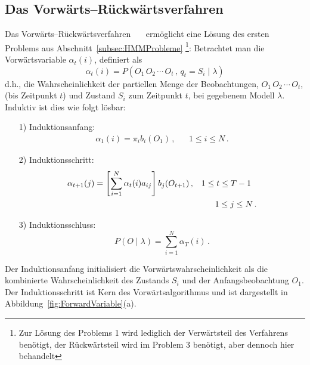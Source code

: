 \subsection{Das Vorw\"arts--R\"uckw\"artsverfahren}
Das Vorw\"arts--R\"uckw\"artsverfahren~\cite{bib:baum}~\cite{bib:sell}~\cite{bib:hmmrabiner} erm\"oglicht eine L\"osung des ersten Problems aus Abschnitt~\ref{subsec:HMMProbleme} \footnote{Zur L\"osung des Problems 1 wird lediglich der Verw\"artsteil des Verfahrens ben\"otigt, der R\"uckw\"artsteil wird im Problem 3 ben\"otigt, aber dennoch hier behandelt}:
Betrachtet man die Vorw\"artsvariable $\alpha_t(i)$, definiert als
\begin{equation}
\alpha_t(i) = P (O_1 \, O_2 \, \cdots \, O_t\,,\, q_t = S_i \mid \lambda)
\end{equation}
d.h., die Wahrscheinlichkeit der partiellen Menge der Beobachtungen, $O_1 \, O_2 \, \cdots \, O_t$, (bis Zeitpunkt $t$) und Zustand $S_i$ zum Zeitpunkt $t$, bei gegebenem Modell $\lambda$. Induktiv ist dies wie folgt l\"osbar:
\begin{itemize}
\item[1) Induktionsanfang:]
\begin{align}
\alpha_1(i) = \pi_i b_i (O_1) \, , & & 1 \leq i \leq N \, .
\end{align}
\item[2) Induktionsschritt:]
\begin{align}
\label{E:forwardIS}
\alpha_{t+1}(j) = \left[\sum_{i = 1}^{N} \alpha_t(i) a_{ij} \right] b_j (O_{t+1}) \, , & & 1 \leq t \leq T - 1 \, \, \, \,\notag \\
 & & 1 \leq j \leq N \, .
\end{align}
\item[3) Induktionsschluss:]
\begin{equation}
P( O \mid \lambda) = \sum_{i = 1}^{N} \alpha_T(i) \, .
\end{equation}
\end{itemize}
Der Induktionsanfang initialisiert die Vorw\"artswahrscheinlichkeit als die kombinierte Wahrscheinlichkeit des Zustands $S_i$ und der Anfangsbeobachtung $O_1$. Der Induktionsschritt ist Kern des Vorw\"artsalgorithmus und ist dargestellt in Abbildung~\ref{fig:ForwardVariable}(a).
